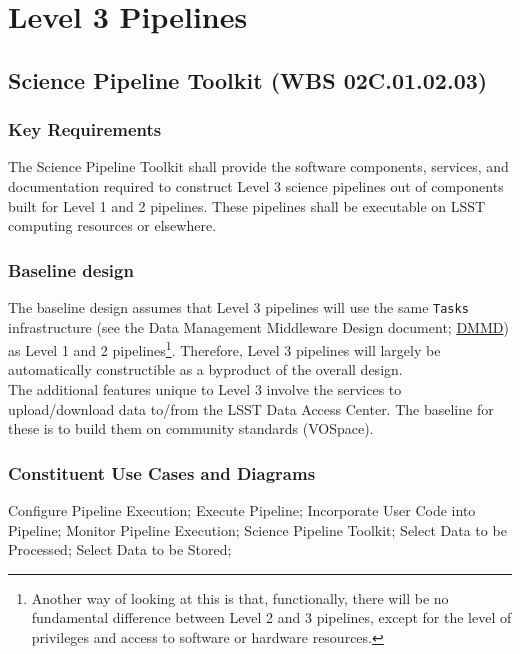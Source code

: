\documentclass[12pt]{article}
\newcommand{\ds}[2]{{\color{blue} \href{https://docushare.lsstcorp.org/docushare/dsweb/Get/#1}{#2}}\xspace}
\newcommand{\DMMD}{\ds{LDM-152}{DMMD}}
\newcommand{\wbsSPT}{WBS 02C.01.02.03}
\begin{document}
\clearpage

\section{Level 3 Pipelines}

\subsection{Science Pipeline Toolkit (\wbsSPT)}

\subsubsection{Key Requirements}

The Science Pipeline Toolkit shall provide the software components, services, and documentation required to construct Level 3 science pipelines out of components built for Level 1 and 2 pipelines. These pipelines shall be executable on LSST computing resources or elsewhere.

\subsubsection{Baseline design}

The baseline design assumes that Level 3 pipelines will use the same {\tt Tasks} infrastructure (see the Data Management Middleware Design document; \DMMD) as Level 1 and 2 pipelines\footnote{Another way of looking at this is that, functionally, there will be no fundamental difference between Level 2 and 3 pipelines, except for the level of privileges and access to software or hardware resources.}. Therefore, Level 3 pipelines will largely be automatically constructible as a byproduct of the overall design.
\\

The additional features unique to Level 3 involve the services to upload/download data to/from the LSST Data Access Center. The baseline for these is to build them on community standards (VOSpace).

\subsubsection{Constituent Use Cases and Diagrams}

Configure Pipeline Execution;
Execute Pipeline;
Incorporate User Code into Pipeline;
Monitor Pipeline Execution;
Science Pipeline Toolkit;
Select Data to be Processed;
Select Data to be Stored;
\end{document}
